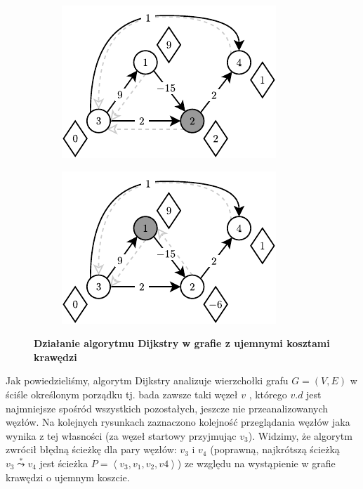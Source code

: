 \begin{figure}[!htbp]
\begin{subfigure}[b]{0.3\textwidth}
		\caption{}
	\end{subfigure}
	\begin{subfigure}[b]{0.3\textwidth}
		\includegraphics[width=\textwidth]{Chapter_II/DIJKSTRA-NegativeArc/d.pdf}
		\caption{}
	\end{subfigure}%
	\begin{subfigure}[b]{0.3\textwidth}
		\includegraphics[width=\textwidth]{Chapter_II/DIJKSTRA-NegativeArc/e.pdf}
		\caption{}
	\end{subfigure}
	\caption{\textbf{Działanie algorytmu Dijkstry w grafie z ujemnymi kosztami krawędzi}} \label{fig:exapleDijkstraNegativArc}
\end{figure}

Jak powiedzieliśmy, algorytm Dijkstry analizuje wierzchołki grafu $G = \left( V, E \right)$ w ściśle określonym porządku tj. bada zawsze taki węzeł $v$ , którego $v.d$ jest najmniejsze spośród wszystkich pozostałych, jeszcze nie przeanalizowanych węzłów. Na kolejnych rysunkach zaznaczono kolejność przeglądania węzłów jaka wynika z tej własności (za węzeł startowy przyjmując $v_{3}$). Widzimy, że algorytm zwrócił błędną ścieżkę dla pary węzłów: $v_{3}$ i $v_{4}$ (poprawną, najkrótszą ścieżką $v_{3} \overset{*}\leadsto v_{4}$ jest ścieżka $ P = \left \langle v_{3}, v_{1}, v_{2}, v{4} \right \rangle $) ze względu na wystąpienie w grafie krawędzi o ujemnym koszcie. 
\newpage

